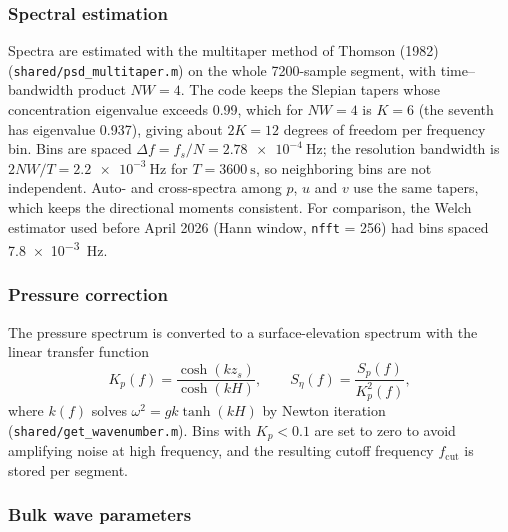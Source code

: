 \subsubsection{Spectral estimation}

Spectra are estimated with the multitaper method of Thomson (1982)
(\texttt{shared/psd\_multitaper.m}) on the whole 7200-sample segment, with
time--bandwidth product $NW = 4$. The code keeps the Slepian tapers whose
concentration eigenvalue exceeds 0.99, which for $NW = 4$ is $K = 6$ (the
seventh has eigenvalue 0.937), giving about $2K = 12$ degrees of freedom per
frequency bin. Bins are spaced $\Delta f = f_s/N = \SI{2.78e-4}{\hertz}$; the
resolution bandwidth is $2NW/T = \SI{2.2e-3}{\hertz}$ for $T = \SI{3600}{\second}$,
so neighboring bins are not independent. Auto- and cross-spectra among $p$, $u$
and $v$ use the same tapers, which keeps the directional moments consistent.
For comparison, the Welch estimator used before April 2026 (Hann window,
\texttt{nfft} = 256) had bins spaced \SI{7.8e-3}{\hertz}.


\subsubsection{Pressure correction}

The pressure spectrum is converted to a surface-elevation spectrum with the
linear transfer function
%
\begin{equation}
  K_p(f) = \frac{\cosh(k z_s)}{\cosh(k H)} ,
  \qquad S_\eta(f) = \frac{S_p(f)}{K_p^2(f)} ,
  \label{eq:kp}
\end{equation}
%
where $k(f)$ solves $\omega^2 = g k \tanh(kH)$ by Newton iteration
(\texttt{shared/get\_wavenumber.m}). Bins with $K_p < 0.1$ are set to zero to
avoid amplifying noise at high frequency, and the resulting cutoff frequency
$f_\text{cut}$ is stored per segment.

\subsubsection{Bulk wave parameters}


